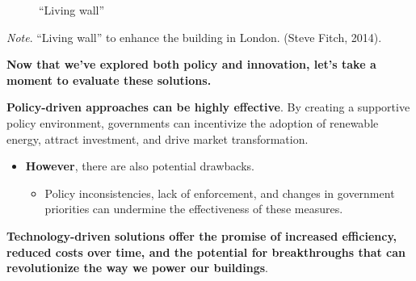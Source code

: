 \documentclass[
  letterpaper,
  DIV=11,
  numbers=noendperiod]{scrartcl}
\providecommand{\tightlist}{%
  \setlength{\itemsep}{0pt}\setlength{\parskip}{0pt}}\usepackage{longtable,booktabs,array}
\begin{document}
\begin{figure}


\caption{\label{fig-solutions}``Living wall''}

\end{figure}%

\emph{Note}. ``Living wall'' to enhance the building in London. (Steve
Fitch, 2014).

\textbf{Now that we've explored both policy and innovation, let's take a
moment to evaluate these solutions.}

\textbf{Policy-driven approaches can be highly effective}. By creating a
supportive policy environment, governments can incentivize the adoption
of renewable energy, attract investment, and drive market
transformation.

\begin{itemize}
\tightlist
\item
  \textbf{However}, there are also potential drawbacks.

  \begin{itemize}
  \tightlist
  \item
    Policy inconsistencies, lack of enforcement, and changes in
    government priorities can undermine the effectiveness of these
    measures.
  \end{itemize}
\end{itemize}

\textbf{Technology-driven solutions offer the promise of increased
efficiency, reduced costs over time, and the potential for breakthroughs
that can revolutionize the way we power our buildings}.
\end{document}
